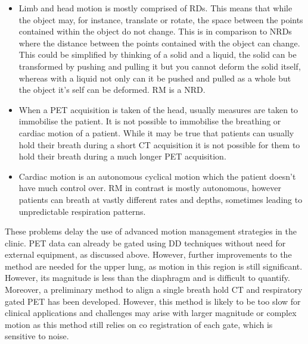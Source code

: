         \begin{itemize}
            \item Limb and head motion is mostly comprised of \gls{RD}s. This means that while the object may, for instance, translate or rotate, the space between the points contained within the object do not change. This is in comparison to \gls{NRD}s where the distance between the points contained with the object can change. This could be simplified by thinking of a solid and a liquid, the solid can be transformed by pushing and pulling it but you cannot deform the solid itself, whereas with a liquid not only can it be pushed and pulled as a whole but the object it's self can be deformed. \gls{RM} is a \gls{NRD}.
            
            \item When a \gls{PET} acquisition is taken of the head, usually measures are taken to immobilise the patient. It is not possible to immobilise the breathing or cardiac motion of a patient. While it may be true that patients can usually hold their breath during a short \gls{CT} acquisition it is not possible for them to hold their breath during a much longer \gls{PET} acquisition.
            
            \item Cardiac motion is an autonomous cyclical motion which the patient doesn't have much control over. \gls{RM} in contrast is mostly autonomous, however patients can breath at vastly different rates and depths, sometimes leading to unpredictable respiration patterns. %
        \end{itemize}
        
        These problems delay the use of advanced motion management strategies in the clinic. \gls{PET} data can already be gated using \gls{DD} techniques without need for external equipment, as discussed above. However, further improvements to the method are needed for the upper lung, as motion in this region is still significant. However, its magnitude is less than the diaphragm and is difficult to quantify. Moreover, a preliminary method to align a single breath hold \gls{CT} and respiratory gated \gls{PET} has been developed. However, this method is likely to be too slow for clinical applications and challenges may arise with larger magnitude or complex motion as this method still relies on co registration of each gate, which is sensitive to noise.
        
